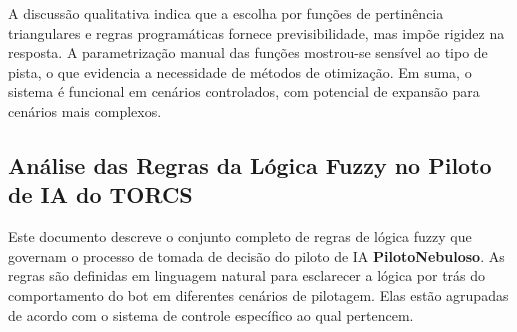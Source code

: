\documentclass[12pt]{article}
\begin{document}
A discuss\~ao qualitativa indica que a escolha por fun\c{c}\~oes de pertin\^encia triangulares e regras program\'aticas fornece previsibilidade, mas imp\~oe rigidez na resposta. A parametriza\c{c}\~ao manual das fun\c{c}\~oes mostrou-se sens\'ivel ao tipo de pista, o que evidencia a necessidade de m\'etodos de otimiza\c{c}\~ao. Em suma, o sistema \'e funcional em cen\'arios controlados, com potencial de expans\~ao para cen\'arios mais complexos.

\subsection{Análise das Regras da Lógica Fuzzy no Piloto de IA do TORCS}
Este documento descreve o conjunto completo de regras de lógica fuzzy que governam o processo de tomada de decisão do piloto de IA \textbf{PilotoNebuloso}. As regras são definidas em linguagem natural para esclarecer a lógica por trás do comportamento do bot em diferentes cenários de pilotagem. Elas estão agrupadas de acordo com o sistema de controle específico ao qual pertencem.
\end{document}

